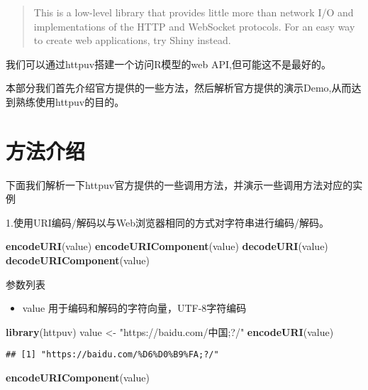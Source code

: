 \documentclass[]{book}
\newenvironment{Shaded}{\begin{snugshade}}{\end{snugshade}}
\newcommand{\KeywordTok}[1]{\textcolor[rgb]{0.13,0.29,0.53}{\textbf{#1}}}
\newcommand{\StringTok}[1]{\textcolor[rgb]{0.31,0.60,0.02}{#1}}
\newcommand{\NormalTok}[1]{#1}
\providecommand{\tightlist}{%
  \setlength{\itemsep}{0pt}\setlength{\parskip}{0pt}}
\theoremstyle{definition}
\theoremstyle{definition}
\theoremstyle{definition}
\theoremstyle{remark}
\begin{document}
\begin{quote}
This is a low-level library that provides little more than network I/O
and implementations of the HTTP and WebSocket protocols. For an easy way
to create web applications, try Shiny instead.
\end{quote}

我们可以通过httpuv搭建一个访问R模型的web API,但可能这不是最好的。

本部分我们首先介绍官方提供的一些方法，然后解析官方提供的演示Demo,从而达到熟练使用httpuv的目的。

\section{方法介绍}

下面我们解析一下httpuv官方提供的一些调用方法，并演示一些调用方法对应的实例

1.使用URI编码/解码以与Web浏览器相同的方式对字符串进行编码/解码。

\begin{Shaded}
\begin{Highlighting}[]
\KeywordTok{encodeURI}\NormalTok{(value)}
\KeywordTok{encodeURIComponent}\NormalTok{(value)}
\KeywordTok{decodeURI}\NormalTok{(value)}
\KeywordTok{decodeURIComponent}\NormalTok{(value)}
\end{Highlighting}
\end{Shaded}

参数列表

\begin{itemize}
\tightlist
\item
  value 用于编码和解码的字符向量，UTF-8字符编码
\end{itemize}

\begin{Shaded}
\begin{Highlighting}[]
\KeywordTok{library}\NormalTok{(httpuv)}
\NormalTok{value <-}\StringTok{ "https://baidu.com/中国;?/"}
\KeywordTok{encodeURI}\NormalTok{(value)}
\end{Highlighting}
\end{Shaded}

\begin{verbatim}
## [1] "https://baidu.com/%D6%D0%B9%FA;?/"
\end{verbatim}

\begin{Shaded}
\begin{Highlighting}[]
\KeywordTok{encodeURIComponent}\NormalTok{(value)}
\end{Highlighting}
\end{Shaded}
\end{document}

